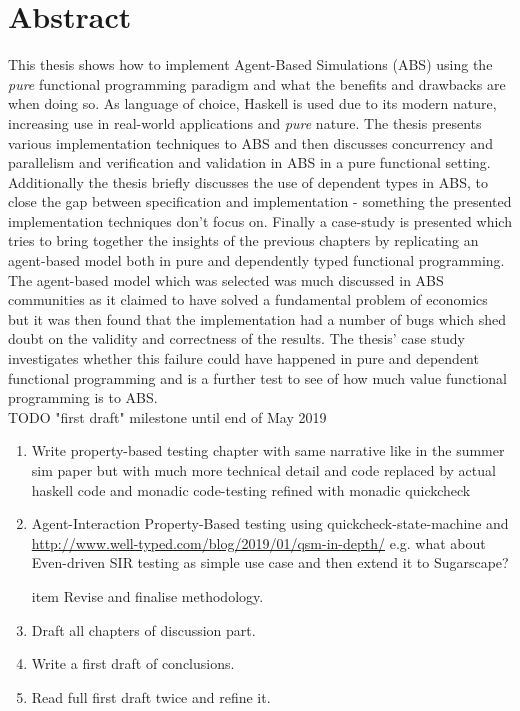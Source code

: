 \documentclass[oneside]{book}
\begin{document}
\section*{Abstract}
This thesis shows how to implement Agent-Based Simulations (ABS) using the \textit{pure} functional programming paradigm and what the benefits and drawbacks are when doing so. As language of choice, Haskell is used due to its modern nature, increasing use in real-world applications and \textit{pure} nature. The thesis presents various implementation techniques to ABS and then discusses concurrency and parallelism and verification and validation in ABS in a pure functional setting. Additionally the thesis briefly discusses the use of dependent types in ABS, to close the gap between specification and implementation - something the presented implementation techniques don't focus on.
Finally a case-study is presented which tries to bring together the insights of the previous chapters by replicating an agent-based model both in pure and dependently typed functional programming. The agent-based model which was selected was much discussed in ABS communities as it claimed to have solved a fundamental problem of economics but it was then found that the implementation had a number of bugs which shed doubt on the validity and correctness of the results. The thesis' case study investigates whether this failure could have happened in pure and dependent functional programming and is a further test to see of how much value functional programming is to ABS. \\


TODO "first draft" milestone until end of May 2019
\begin{enumerate}
	\item Write property-based testing chapter with same narrative like in the summer sim paper but with much more technical detail and code replaced by actual haskell code and monadic code-testing refined with monadic quickcheck	
	
	\item Agent-Interaction Property-Based testing using quickcheck-state-machine and \cite{de_vries_-depth_2019} \url{http://www.well-typed.com/blog/2019/01/qsm-in-depth/} e.g. what about Even-driven SIR testing as simple use case and then extend it to Sugarscape?

	item Revise and finalise methodology.

	\item Draft all chapters of discussion part.
	
	\item Write a first draft of conclusions.
	
	\item Read full first draft twice and refine it.
\end{enumerate}
\end{document}
